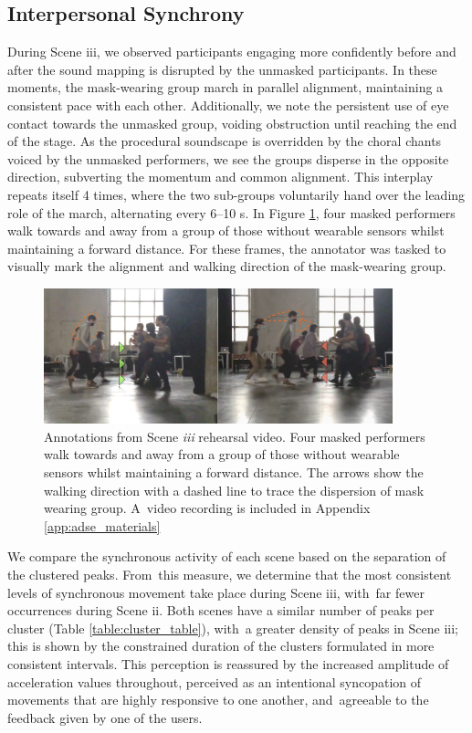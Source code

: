 \subsection*{Interpersonal Synchrony}

During Scene iii, we observed participants engaging more confidently before and after the sound mapping is disrupted by the unmasked participants. In these moments, the mask-wearing group march in parallel alignment, maintaining a consistent pace with each other. Additionally, we note the persistent use of eye contact towards the unmasked group, voiding obstruction until reaching the end of the stage. As the procedural soundscape is overridden by the choral chants voiced by the unmasked performers, we see the groups disperse in the opposite direction, subverting the momentum and common alignment. This interplay repeats itself 4 times, where the two sub-groups voluntarily hand over the leading role of the march, alternating every 6--10 s. In Figure \ref{fig:scene_iii_annotation}, four masked performers walk towards and away from a group of those without wearable sensors whilst maintaining a forward distance. For these frames, the annotator was tasked to visually mark the alignment and walking direction of the mask-wearing group.

\begin{figure}[!h]
\centering
\includegraphics[width=0.9\textwidth,keepaspectratio]{Chapters/Figures/adse_ess/scene_iii-merged-2.png}
{
\caption[Annotations from Scene \textit{iii} rehearsal video]{Annotations from Scene \textit{iii} rehearsal video. Four masked performers walk towards and away from a group of those without wearable sensors whilst maintaining a forward distance. The arrows show the walking direction with a dashed line to trace the dispersion of mask wearing group. A~video recording is included in Appendix \ref{app:adse_materials}
}
\label{fig:scene_iii_annotation}
}
\end{figure}

We compare the synchronous activity of each scene based on the separation of the clustered peaks. From~this measure, we determine that the most consistent levels of synchronous movement take place during Scene iii, with~far fewer occurrences during Scene ii. Both scenes have a similar number of peaks per cluster (Table \ref{table:cluster_table}), with~a greater density of peaks in Scene iii; this is shown by the constrained duration of the clusters formulated in more consistent intervals. This perception is reassured by the increased amplitude of acceleration values throughout, perceived as an intentional syncopation of movements that are highly responsive to one another, and~agreeable to the feedback given by one of the users.

